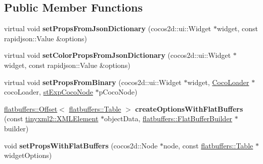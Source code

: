 \subsection*{Public Member Functions}
\begin{DoxyCompactItemize}
\item 
\mbox{\label{classcocostudio_1_1WidgetReader_a3815339ed565102e125af02f8e6b840c}} 
virtual void {\bfseries set\+Props\+From\+Json\+Dictionary} (cocos2d\+::ui\+::\+Widget $\ast$widget, const rapidjson\+::\+Value \&options)
\item 
\mbox{\label{classcocostudio_1_1WidgetReader_a93d73f2e6e0d11477645a2528bf7ded0}} 
virtual void {\bfseries set\+Color\+Props\+From\+Json\+Dictionary} (cocos2d\+::ui\+::\+Widget $\ast$widget, const rapidjson\+::\+Value \&options)
\item 
\mbox{\label{classcocostudio_1_1WidgetReader_ac796325817d372cf7750a117dd1ee541}} 
virtual void {\bfseries set\+Props\+From\+Binary} (cocos2d\+::ui\+::\+Widget $\ast$widget, \hyperlink{classcocostudio_1_1CocoLoader}{Coco\+Loader} $\ast$coco\+Loader, \hyperlink{structcocostudio_1_1stExpCocoNode}{st\+Exp\+Coco\+Node} $\ast$p\+Coco\+Node)
\item 
\mbox{\label{classcocostudio_1_1WidgetReader_a42697ef33100cf91ea0921cc27a9db75}} 
\hyperlink{structflatbuffers_1_1Offset}{flatbuffers\+::\+Offset}$<$ \hyperlink{classflatbuffers_1_1Table}{flatbuffers\+::\+Table} $>$ {\bfseries create\+Options\+With\+Flat\+Buffers} (const \hyperlink{classtinyxml2_1_1XMLElement}{tinyxml2\+::\+X\+M\+L\+Element} $\ast$object\+Data, \hyperlink{classflatbuffers_1_1FlatBufferBuilder}{flatbuffers\+::\+Flat\+Buffer\+Builder} $\ast$builder)
\item 
\mbox{\label{classcocostudio_1_1WidgetReader_af19ca435256596a00b10f43ea3badf30}} 
void {\bfseries set\+Props\+With\+Flat\+Buffers} (cocos2d\+::\+Node $\ast$node, const \hyperlink{classflatbuffers_1_1Table}{flatbuffers\+::\+Table} $\ast$widget\+Options)
\item 
\mbox{\label{classcocostudio_1_1WidgetReader_a21e4598ba0d37aed66fb50baa6d3f741}} 

\end{DoxyCompactItemize}
